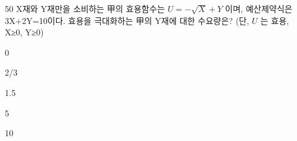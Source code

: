 \begin{question}{50}
X재와 Y재만을 소비하는 甲의 효용함수는 $U=- \sqrt { X } +Y$ 이며, 예산제약식은 3X+2Y=10이다. 효용을 극대화하는 甲의 Y재에 대한 수요량은? (단, $U$ 는 효용, X≥0, Y≥0)
\begin{choices}
  \item 0
  \item 2/3
  \item 1.5
  \item 5
  \item 10
\end{choices}
\end{question}
